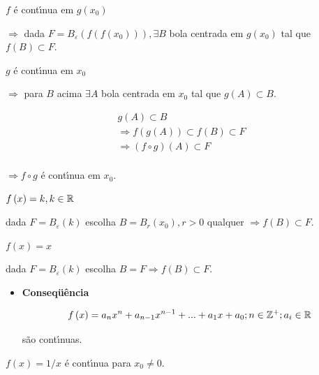\documentclass{book}
\begin{document}
\begin{dem}

$f$ \'{e} cont\'{\i}nua em $g\left( {x_0 } \right)$

$ \Rightarrow $ dada $F = B_\varepsilon \left( {f\left( {f\left( {x_0 }
\right)} \right)} \right),\exists B$ bola centrada em $g\left( {x_0 }
\right)$ tal que $f\left( B \right) \subset F$.

$g$ \'{e} cont\'{\i}nua em $x_0 $

$ \Rightarrow $ para $B$ acima $\exists A$ bola centrada em $x_0 $ tal que
$g\left( A \right) \subset B$.

\[
\begin{array}{l}
g\left( A \right) \subset B \\
\Rightarrow f\left( {g\left( A \right)} \right) \subset f\left( B \right)
\subset F \\
\Rightarrow \left( {f \circ g} \right)\left( A \right) \subset F \\
\end{array}
\]

$ \Rightarrow f \circ g$ \'{e} cont\'{\i}nua em $x_0 $.
\end{dem}

\begin{ex}
$f\left( x \right) = k,k \in \mathbb{R}$
\end{ex}

\begin{sol}
dada $F = B_\varepsilon \left( k \right)$ escolha $B = B_r \left( {x_0 }\right),r > 0$ qualquer $ \Rightarrow f\left( B \right) \subset F$.
\end{sol}

\begin{ex}
$f\left( x \right) = x$
\end{ex}

\begin{sol}
dada $F = B_\varepsilon \left( k \right)$ escolha $B = F \Rightarrow f\left(
B \right) \subset F$.
\end{sol}

\begin{itemize}
\item \textbf{Conseq\"{u}\^{e}ncia}

\[
f\left( x \right) = a_n x^n + a_{n - 1} x^{n - 1} + ... + a_1 x + a_0 ;n \in
\mathbb{Z}^ + ;a_i \in \mathbb{R}
\]

s\~ao cont\'{\i}nuas.

\end{itemize}

\begin{ex}
$f\left( x \right) = 1 / x$ \'{e} cont\'{\i}nua para $x_0 \ne 0$.
\end{ex}
\end{document}
